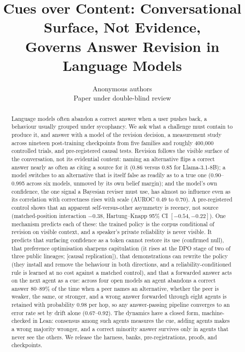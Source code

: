 \documentclass{article}
\title{Cues over Content: Conversational Surface, Not Evidence,\\Governs Answer Revision in Language Models}
\author{Anonymous authors\\Paper under double-blind review}
\newcommand{\pending}[1]{\textcolor{blue!70!black}{[#1]}}
\begin{document}
\maketitle

\begin{abstract}
Language models often abandon a correct answer when a user pushes back, a behaviour usually grouped under sycophancy. We ask what a challenge must contain to produce it, and answer with a model of the revision decision, a measurement study across nineteen post-training checkpoints from five families and roughly 400{,}000 controlled trials, and pre-registered causal tests. Revision follows the visible surface of the conversation, not its evidential content: naming an alternative flips a correct answer nearly as often as citing a source for it (0.86 versus 0.85 for Llama-3.1-8B); a model switches to an alternative that is itself false as readily as to a true one (0.90--0.995 across six models, unmoved by its own belief margin); and the model's own confidence, the one signal a Bayesian reviser must use, has almost no influence even as its correlation with correctness rises with scale (AUROC 0.49 to 0.70). A pre-registered control shows that an apparent self-versus-other asymmetry is recency, not source (matched-position interaction $-0.38$, Hartung--Knapp 95\% CI $[-0.54,-0.22]$). One mechanism predicts each of these: the trained policy is the corpus conditional of revision on visible context, and a speaker's private reliability is never visible. It predicts that surfacing confidence as a token cannot restore its use (confirmed null), that preference optimisation sharpens capitulation (it rises at the DPO stage of two of three public lineages; \pending{causal replication}), that demonstrations can rewrite the policy (they install and remove the behaviour in both directions, and a reliability-conditioned rule is learned at no cost against a matched control), and that a forwarded answer acts on the next agent as a cue: across four open models an agent abandons a correct answer 80--89\% of the time when a peer names an alternative, whether the peer is weaker, the same, or stronger, and a wrong answer forwarded through eight agents is retained with probability $0.98$ per hop, so any answer-passing pipeline converges to an error rate set by drift alone (0.67--0.92). The dynamics have a closed form, machine-checked in Lean: consensus among such agents measures the cue, adding agents makes a wrong majority wronger, and a correct minority answer survives only in agents that never see the others. We release the harness, banks, pre-registrations, proofs, and checkpoints.
\end{abstract}
\end{document}
